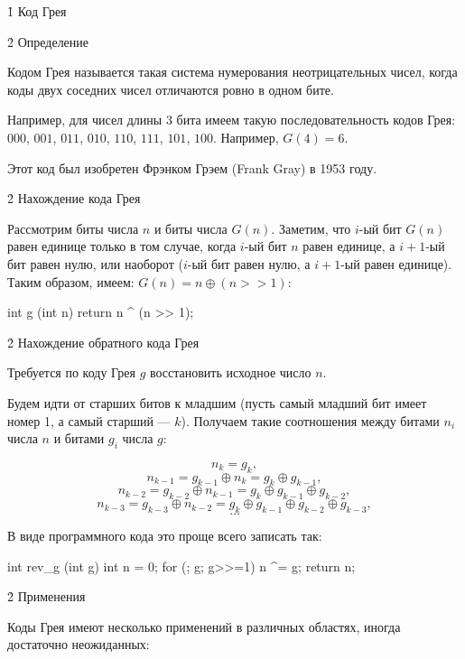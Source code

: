\h1{ Код Грея }


\h2{ Определение }

Кодом Грея называется такая система нумерования неотрицательных чисел, когда коды двух соседних чисел отличаются ровно в одном бите.

Например, для чисел длины 3 бита имеем такую последовательность кодов Грея: $000$, $001$, $011$, $010$, $110$, $111$, $101$, $100$. Например, $G(4)=6$.

Этот код был изобретен Фрэнком Грэем (Frank Gray) в 1953 году.


\h2{ Нахождение кода Грея }

Рассмотрим биты числа $n$ и биты числа $G(n)$. Заметим, что $i$-ый бит $G(n)$ равен единице только в том случае, когда $i$-ый бит $n$ равен единице, а $i+1$-ый бит равен нулю, или наоборот ($i$-ый бит равен нулю, а $i+1$-ый равен единице). Таким образом, имеем: $G(n) = n \oplus (n>>1)$:

\code
int g (int n) {
	return n ^ (n >> 1);
}
\endcode


\h2{ Нахождение обратного кода Грея }

Требуется по коду Грея $g$ восстановить исходное число $n$.

Будем идти от старших битов к младшим (пусть самый младший бит имеет номер 1, а самый старший --- $k$). Получаем такие соотношения между битами $n_i$ числа $n$ и битами $g_i$ числа $g$:

$$ n_k = g_k, $$
$$ n_{k-1} = g_{k-1} \oplus n_k = g_k \oplus g_{k-1}, $$
$$ n_{k-2} = g_{k-2} \oplus n_{k-1} = g_k \oplus g_{k-1} \oplus g_{k-2}, $$
$$ n_{k-3} = g_{k-3} \oplus n_{k-2} = g_k \oplus g_{k-1} \oplus g_{k-2} \oplus g_{k-3}, $$
$$ \ldots $$

В виде программного кода это проще всего записать так:

\code
int rev_g (int g) {
	int n = 0;
	for (; g; g>>=1)
		n ^= g;
	return n;
}
\endcode


\h2{ Применения }

Коды Грея имеют несколько применений в различных областях, иногда достаточно неожиданных:

